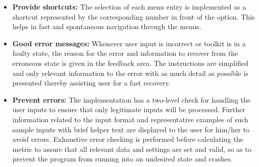 \begin{itemize}
	\item \textbf{Provide shortcuts:} The selection of each menu entry is implemented as a shortcut represented by the corresponding number in front of the option. This helps in fast and spontaneous navigation through the menus.
	\item \textbf{Good error messages:} Whenever user input is incorrect or toolkit is in a faulty state, the reason for the error and information to recover from the erroneous state is given in the feedback area. The instructions are simplified and only relevant information to the error with as much detail as possible is presented thereby assisting user for a fast recovery.
	\item \textbf{Prevent errors:} The implementation has a two-level check for handling the user inputs to ensure that only legitimate inputs will be processed. Further information related to the input format and representative examples of such sample inputs with brief helper text are displayed to the user for him/her to avoid errors. Exhaustive error checking is performed before calculating the metric to assure that all relevant data and settings are set and valid, so as to prevent
		the program from running into an undesired state and crashes.
\end{itemize}


